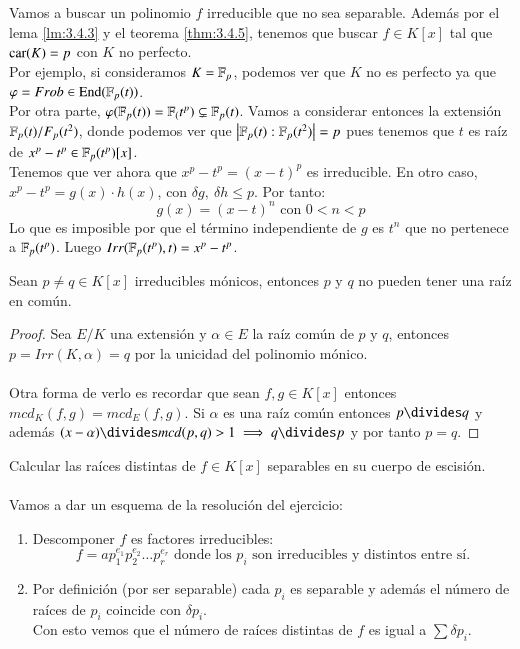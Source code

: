 \begin{eg}
    Vamos a buscar un polinomio $f$ irreducible que no sea separable. Además por el lema \ref{lm:3.4.3} y el teorema \ref{thm:3.4.5}, tenemos que buscar $f \in K[x]$ tal que $\mathrm{car}(K) = p$ con $K$ no perfecto.\\
    Por ejemplo, si consideramos $K = \mathbb{F}_p$, podemos ver que $K$ no es perfecto ya que $\varphi = Frob \in \mathrm{End}(\mathbb{F}_p(t))$.\\
    Por otra parte, $\varphi(\mathbb{F}_p(t)) = \mathbb{F}_(t^p) \subsetneq \mathbb{F}_p(t)$. Vamos a considerar entonces la extensión $\mathbb{F}_p(t)/F_p(t^2)$, donde podemos ver que $\left|\mathbb{F}_p(t) : \mathbb{F}_p(t^2)\right| = p$ pues tenemos que $t$ es raíz de $x^p - t^p \in \mathbb{F}_p(t^p)[x]$.\\

    Tenemos que ver ahora que $x^p - t^p = (x - t)^p$ es irreducible. En otro caso, $x^p - t^p = g(x) \cdot h(x)$, con $\delta g,\ \delta h \leq p$. Por tanto:
    $$
        g(x) = (x - t)^n \text{ con } 0 < n < p
    $$
    Lo que es imposible por que el término independiente de $g$ es $t^n$ que no pertenece a $\mathbb{F}_p(t^p)$. Luego $Irr(\mathbb{F}_p(t^p), t) = x^p - t^p$.
\end{eg}

\begin{pro}
    Sean $p \neq q \in K[x]$ irreducibles mónicos, entonces $p$ y $q$ no pueden tener una raíz en común.
\end{pro}

\begin{proof}
    Sea $E/K$ una extensión y $\alpha \in E$ la raíz común de $p$ y $q$, entonces $p = Irr(K, \alpha) = q$ por la unicidad del polinomio mónico.\\\\
    Otra forma de verlo es recordar que sean $f, g \in K[x]$ entonces $mcd_K(f, g) = mcd_E(f, g)$. Si $\alpha$ es una raíz común entonces $p \divides q$ y además $(x - \alpha) \divides mcd(p, q) > 1 \implies q \divides p$ y por tanto $p = q$.
\end{proof}

\begin{ex}[H3.??]
    Calcular las raíces distintas de $f \in K[x]$ separables en su cuerpo de escisión.\\\\
    Vamos a dar un esquema de la resolución del ejercicio:
    \begin{enumerate}
        \item Descomponer $f$ es factores irreducibles:
        $$
            f = a p_1^{e_1} p_2^{e_2} \ldots p_r^{e_r} \text{ donde los $p_i$ son irreducibles y distintos entre sí.}
        $$
        \item Por definición (por ser separable) cada $p_i$ es separable y además el número de raíces de $p_i$ coincide con $\delta p_i$.\\
        Con esto vemos que el número de raíces distintas de $f$ es igual a $\sum \delta p_i$.
    \end{enumerate}
\end{ex}


